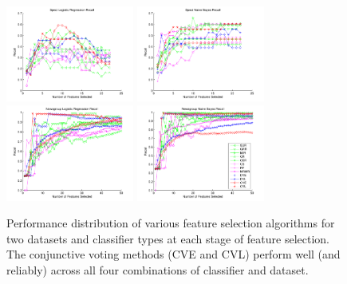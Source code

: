 \begin{figure}[tbp!]
\centering
\includegraphics[width=0.375\textwidth]{./figures/linegraphs/SpectLogisticRegressionRecall.pdf}
\includegraphics[width=0.375\textwidth]{./figures/linegraphs/SpectNaiveBayesRecall.pdf}\\
\includegraphics[width=0.375\textwidth]{./figures/linegraphs/NewsgroupLogisticRegressionRecall.pdf}
\includegraphics[width=0.375\textwidth]{./figures/linegraphs/NewsgroupNaiveBayesRecall.pdf}
\caption{\footnotesize Performance distribution of various feature selection algorithms for two datasets and classifier types at each stage of feature selection.  The conjunctive voting methods (CVE and CVL)
perform well (and reliably) across all four combinations of classifier and dataset.}
\label{fig:perf_vs_fs_alg}
\vspace{-3mm}
\end{figure}

